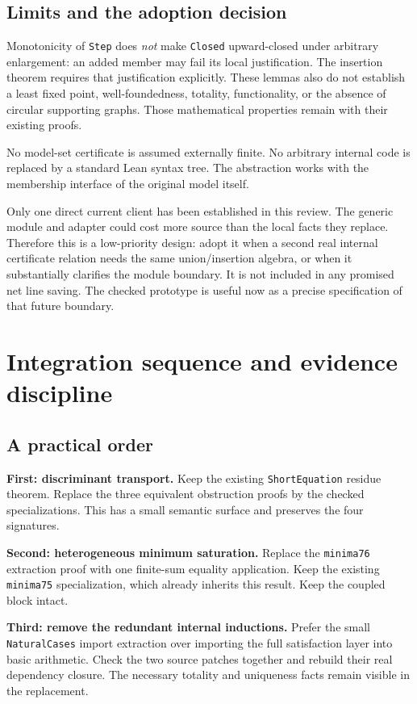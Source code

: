 \documentclass[11pt,letterpaper]{article}
\newcommand{\code}[1]{\nolinkurl{#1}}
\begin{document}
\subsection{Limits and the adoption decision}

Monotonicity of \code{Step} does \emph{not} make \code{Closed} upward-closed under arbitrary enlargement: an added member may fail its local justification. The insertion theorem requires that justification explicitly. These lemmas also do not establish a least fixed point, well-foundedness, totality, functionality, or the absence of circular supporting graphs. Those mathematical properties remain with their existing proofs.

No model-set certificate is assumed externally finite. No arbitrary internal code is replaced by a standard Lean syntax tree. The abstraction works with the membership interface of the original model itself.

Only one direct current client has been established in this review. The generic module and adapter could cost more source than the local facts they replace. Therefore this is a low-priority design: adopt it when a second real internal certificate relation needs the same union/insertion algebra, or when it substantially clarifies the module boundary. It is not included in any promised net line saving. The checked prototype is useful now as a precise specification of that future boundary.

\section{Integration sequence and evidence discipline}

\subsection{A practical order}

\textbf{First: discriminant transport.} Keep the existing \code{ShortEquation} residue theorem. Replace the three equivalent obstruction proofs by the checked specializations. This has a small semantic surface and preserves the four signatures.

\textbf{Second: heterogeneous minimum saturation.} Replace the \code{minima76} extraction proof with one finite-sum equality application. Keep the existing \code{minima75} specialization, which already inherits this result. Keep the coupled block intact.

\textbf{Third: remove the redundant internal inductions.} Prefer the small \code{NaturalCases} import extraction over importing the full satisfaction layer into basic arithmetic. Check the two source patches together and rebuild their real dependency closure. The necessary totality and uniqueness facts remain visible in the replacement.
\end{document}
